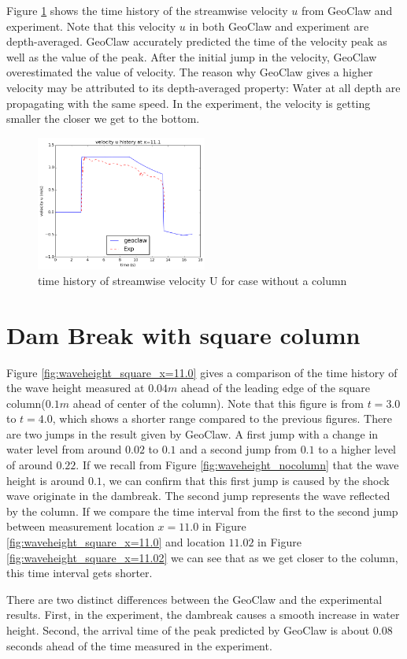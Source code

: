 \documentclass[11pt]{article}
\begin{document}
Figure \ref{fig:velocityU_nocolumn} shows the time history of the streamwise velocity $u$ from GeoClaw and experiment. 
Note that this velocity $u$ in both GeoClaw and experiment are depth-averaged. 
GeoClaw accurately predicted the time of the velocity peak as well as the value of the peak. 
After the initial jump in the velocity, GeoClaw overestimated the value of velocity.
The reason why GeoClaw gives a higher velocity may be attributed to its depth-averaged property: Water at all depth are propagating with the same speed. In the experiment, the velocity is getting smaller the closer we get to the bottom. 
\begin{figure}[h!]
    \centering
    \includegraphics[width=0.5\textwidth]{./plots/velocityU_nocolumn}
    \caption{time history of streamwise velocity U for case without a column}
    \label{fig:velocityU_nocolumn}
\end{figure}




\section{Dam Break with square column}\label{Sec:Square}
Figure \ref{fig:waveheight_square_x=11.0} gives a comparison of the time history of the wave height measured at $0.04m$ ahead of the leading edge of the square column($0.1m$ ahead of center of the column).
Note that this figure is from $t=3.0$ to $t=4.0$, which shows a shorter range compared to the previous figures.
There are two jumps in the result given by GeoClaw. A first jump with a change in water level from around $0.02$ to $0.1$ and a second jump from $0.1$ to a higher level of around $0.22$.
If we recall from Figure \ref{fig:waveheight_nocolumn} that the wave height is around $0.1$, we can confirm that this first jump is caused by the shock wave originate in the dambreak. The second jump represents the wave reflected by the column.  
If we compare the time interval from the first to the second jump between measurement location $x=11.0$ in Figure \ref{fig:waveheight_square_x=11.0} and location $11.02$ in Figure \ref{fig:waveheight_square_x=11.02} we can see that as we get closer to the column, this time interval gets shorter.
\par
There are two distinct differences between the GeoClaw and the experimental results. First, in the experiment, the dambreak causes a smooth increase in water height. Second, the arrival time of the peak predicted by GeoClaw is about $0.08$ seconds ahead of the time measured in the experiment.  
\par
\end{document}
